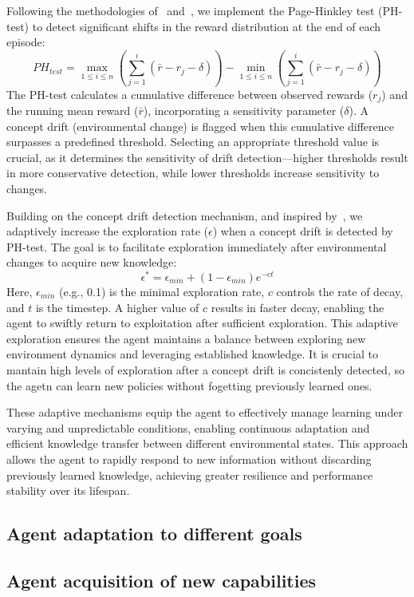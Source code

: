 Following the methodologies of~\citet{mignon2017adaptive} and~\citet{networkdynamicrl}, we implement the Page-Hinkley test (PH-test) to detect significant shifts in the reward distribution at the end of each episode:
\begin{equation}
    \label{eq:ph_test}
    PH_{test} = \max_{1 \leq i \leq n} \left(\sum_{j=1}^{i}(\bar{r}-r_j-\delta)\right) - \min_{1 \leq i \leq n}\left(\sum_{j=1}^{i}(\bar{r}-r_j-\delta)\right)
\end{equation}
The PH-test calculates a cumulative difference between observed rewards ($r_j$) and the running mean reward ($\bar{r}$), incorporating a sensitivity parameter ($\delta$). A concept drift (environmental change) is flagged when this cumulative difference surpasses a predefined threshold. Selecting an appropriate threshold value is crucial, as it determines the sensitivity of drift detection—higher thresholds result in more conservative detection, while lower thresholds increase sensitivity to changes.

Building on the concept drift detection mechanism, and inspired by~\citet{mignon2017adaptive}, we adaptively increase the exploration rate ($\epsilon$) when a concept drift is detected by PH-test. The goal is to facilitate exploration immediately after environmental changes to acquire new knowledge:
\begin{equation}
    \label{eq:epsilon_greedy}
    \epsilon^* = \epsilon_{min} + (1-\epsilon_{min}) e^{-ct}
\end{equation}
Here, $\epsilon_{min}$ (e.g., 0.1) is the minimal exploration rate, $c$ controls the rate of decay, and $t$ is the timestep. A higher value of $c$ results in faster decay, enabling the agent to swiftly return to exploitation after sufficient exploration. This adaptive exploration ensures the agent maintains a balance between exploring new environment dynamics and leveraging established knowledge. It is crucial to mantain high levels of exploration after a concept drift is concistenly detected, so the agetn can learn new policies  without fogetting previously learned ones.

These adaptive mechanisms equip the agent to effectively manage learning under varying and unpredictable conditions, enabling continuous adaptation and efficient knowledge transfer between different environmental states. This approach allows the agent to rapidly respond to new information without discarding previously learned knowledge, achieving greater resilience and performance stability over its lifespan. 

\subsection{Agent adaptation to different goals}


\subsection{Agent acquisition of new capabilities}


\endinput

